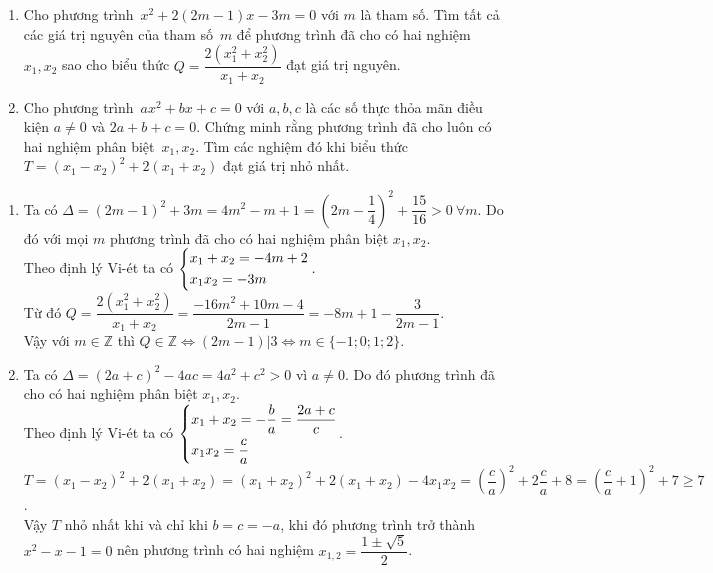 \begin{ex}%
    \hfill
    \begin{enumerate}
    \item Cho phương trình $x^2+2(2m-1)x-3m=0$ với $m$ là tham số. Tìm tất cả các giá trị nguyên của tham số $m$ để phương trình đã cho có hai nghiệm $x_1, x_2$ sao cho biểu thức $Q=\dfrac{2(x_1^2+x_2^2)}{x_1+x_2}$ đạt giá trị nguyên.
    \item Cho phương trình $ax^{2}+bx+c=0$ với $a, b, c$ là các số thực thỏa mãn điều kiện $a\neq 0$ và $2a+b+c=0$. Chứng minh rằng phương trình đã cho luôn có hai nghiệm phân biệt $x_1, x_2$. Tìm các nghiệm đó khi biểu thức $T=(x_{1}-x_{2})^{2}+2(x_{1}+x_{2})$ đạt giá trị nhỏ nhất.
    \end{enumerate}
\loigiai
    {
    \begin{enumerate}
        \item Ta có $\Delta=(2m-1)^2+3m=4m^2-m+1=\left(2m-\dfrac{1}{4}\right)^2+\dfrac{15}{16}>0\  \forall m$. Do đó với mọi $m$ phương trình đã cho có hai nghiệm phân biệt $x_1, x_2$.\\
            Theo định lý Vi-ét ta có $\left\{\begin{aligned}&x_1+x_2=-4m+2\\&x_1x_2=-3m\end{aligned}\right..$\\
            Từ đó $Q=\dfrac{2(x_1^2+x_2^2)}{x_1+x_2}=\dfrac{-16m^2+10m-4}{2m-1}=-8m+1-\dfrac{3}{2m-1}.$\\
            Vậy với $m\in \mathbb{Z}$ thì $Q\in \mathbb{Z}\Leftrightarrow (2m-1) | 3 \Leftrightarrow m\in\{-1;0;1;2\}.$
        \item Ta có $\Delta=(2a+c)^2-4ac=4a^2+c^2>0$ vì $a\neq 0$. Do đó phương trình đã cho có hai nghiệm phân biệt $x_1, x_2$.\\
             Theo định lý Vi-ét ta có $\left\{\begin{aligned}&x_1+x_2=-\dfrac{b}{a}=\dfrac{2a+c}{c}\\&x_1x_2=\dfrac{c}{a}\end{aligned}\right.$.\\
             $T=(x_{1}-x_{2})^{2}+2(x_{1}+x_{2})=(x_1+x_2)^2+2(x_1+x_2)-4x_1x_2=\left(\dfrac{c}{a}\right)^2+2\dfrac{c}{a}+8=\left(\dfrac{c}{a}+1\right)^2+7\geq 7$.\\
             Vậy $T$ nhỏ nhất khi và chỉ khi $b=c=-a$, khi đó phương trình trở thành $x^2-x-1=0$ nên phương trình có hai nghiệm $x_{1,2}=\dfrac{1\pm\sqrt{5}}{2}$.
    \end{enumerate}
    }
\end{ex}

